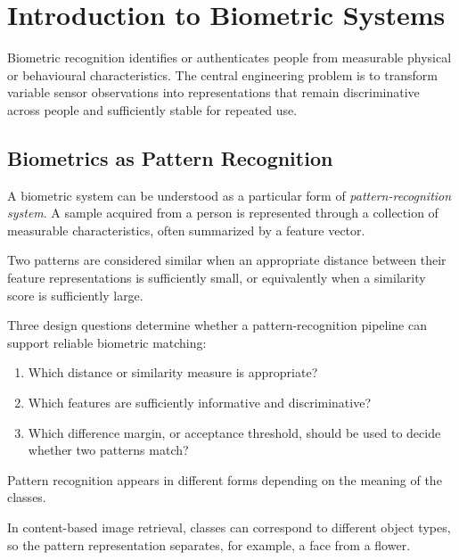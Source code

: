 \documentclass[11pt,a4paper,oneside]{report}
\begin{document}
\clearpage

\chapter{Introduction to Biometric Systems}
\label{sec:introduction}

Biometric recognition identifies or authenticates people from measurable
physical or behavioural characteristics. The central engineering problem is
to transform variable sensor observations into representations that remain
discriminative across people and sufficiently stable for repeated use.


\section{Biometrics as Pattern Recognition}
\label{subsec:pattern-recognition}

A biometric system can be understood as a particular form of
\emph{pattern-recognition system}. A sample acquired from a person is
represented through a collection of measurable characteristics, often
summarized by a feature vector.

Two patterns are considered similar when an appropriate distance between
their feature representations is sufficiently small, or equivalently
when a similarity score is sufficiently large.

Three design questions determine whether a pattern-recognition pipeline can support reliable biometric matching:

\begin{enumerate}
    \item Which distance or similarity measure is appropriate?

    \item Which features are sufficiently informative and discriminative?

    \item Which difference margin, or acceptance threshold, should be used
    to decide whether two patterns match?
\end{enumerate}

Pattern recognition appears in different forms depending on the meaning
of the classes.

In content-based image retrieval, classes can correspond to different
object types, so the pattern representation separates, for example,
a face from a flower.
\end{document}
